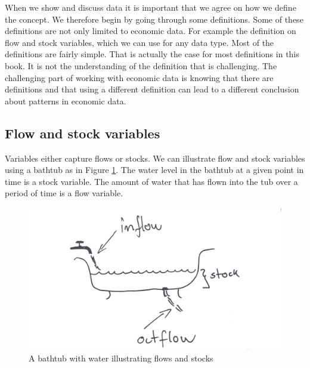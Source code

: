 \documentclass[]{book}
\begin{document}
When we show and discuss data it is important that we agree on how we define the concept. We therefore begin by going through some definitions. Some of these definitions are not only limited to economic data. For example the definition on flow and stock variables, which we can use for any data type. Most of the definitions are fairly simple. That is actually the case for most definitions in this book. It is not the understanding of the definition that is challenging. The challenging part of working with economic data is knowing that there are definitions and that using a different definition can lead to a different conclusion about patterns in economic data.

\hypertarget{flow-and-stock-variables}{%
\subsection{Flow and stock variables}\label{flow-and-stock-variables}}

Variables either capture flows or stocks. We can illustrate flow and stock variables using a bathtub as in Figure \ref{fig:baththub}. The water level in the bathtub at a given point in time is a stock variable. The amount of water that has flown into the tub over a period of time is a flow variable.

\begin{figure}

{\centering \includegraphics[width=0.9\linewidth]{_resources/chapter_people/flowbathtub} 

}

\caption{A bathtub with water illustrating flows and stocks}\label{fig:baththub}
\end{figure}
\end{document}
